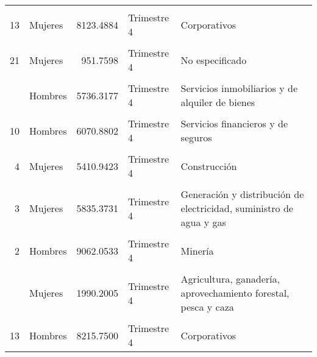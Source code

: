 \documentclass{article}
\begin{document}
\begin{table}[!h]
\begin{tabular}{rlrll}
\addlinespace
\cellcolor{gray!10}{15} & \cellcolor{gray!10}{Hombres} & \cellcolor{gray!10}{6455.2652} & \cellcolor{gray!10}{Trimestre 4} & \cellcolor{gray!10}{Servicios educativos}\\
13 & Mujeres & 8123.4884 & Trimestre 4 & Corporativos\\
\cellcolor{gray!10}{16} & \cellcolor{gray!10}{Hombres} & \cellcolor{gray!10}{6984.2844} & \cellcolor{gray!10}{Trimestre 4} & \cellcolor{gray!10}{Servicios de salud y de asistencia social}\\
21 & Mujeres & 951.7598 & Trimestre 4 & No especificado\\
\cellcolor{gray!10}{9} & \cellcolor{gray!10}{Hombres} & \cellcolor{gray!10}{5518.3414} & \cellcolor{gray!10}{Trimestre 4} & \cellcolor{gray!10}{Información en medios masivos}\\
\addlinespace
11 & Hombres & 5736.3177 & Trimestre 4 & Servicios inmobiliarios y de alquiler de bienes\\
\cellcolor{gray!10}{8} & \cellcolor{gray!10}{Mujeres} & \cellcolor{gray!10}{4748.6511} & \cellcolor{gray!10}{Trimestre 4} & \cellcolor{gray!10}{Transportes, correos y almacenamiento}\\
10 & Hombres & 6070.8802 & Trimestre 4 & Servicios financieros y de seguros\\
\cellcolor{gray!10}{10} & \cellcolor{gray!10}{Mujeres} & \cellcolor{gray!10}{5520.7592} & \cellcolor{gray!10}{Trimestre 4} & \cellcolor{gray!10}{Servicios financieros y de seguros}\\
4 & Mujeres & 5410.9423 & Trimestre 4 & Construcción\\
\addlinespace
\cellcolor{gray!10}{11} & \cellcolor{gray!10}{Mujeres} & \cellcolor{gray!10}{5504.3584} & \cellcolor{gray!10}{Trimestre 4} & \cellcolor{gray!10}{Servicios inmobiliarios y de alquiler de bienes}\\
3 & Mujeres & 5835.3731 & Trimestre 4 & Generación y distribución de electricidad, suministro de agua y gas\\
\cellcolor{gray!10}{17} & \cellcolor{gray!10}{Mujeres} & \cellcolor{gray!10}{3912.0627} & \cellcolor{gray!10}{Trimestre 4} & \cellcolor{gray!10}{Servicios de esparcimiento, culturales y deportivos}\\
2 & Hombres & 9062.0533 & Trimestre 4 & Minería\\
\cellcolor{gray!10}{21} & \cellcolor{gray!10}{Hombres} & \cellcolor{gray!10}{1549.7914} & \cellcolor{gray!10}{Trimestre 4} & \cellcolor{gray!10}{No especificado}\\
\addlinespace
1 & Mujeres & 1990.2005 & Trimestre 4 & Agricultura, ganadería, aprovechamiento forestal, pesca y caza\\
\cellcolor{gray!10}{2} & \cellcolor{gray!10}{Mujeres} & \cellcolor{gray!10}{10260.1807} & \cellcolor{gray!10}{Trimestre 4} & \cellcolor{gray!10}{Minería}\\
13 & Hombres & 8215.7500 & Trimestre 4 & Corporativos\\
\bottomrule
\end{tabular}
\end{table}
\end{document}
